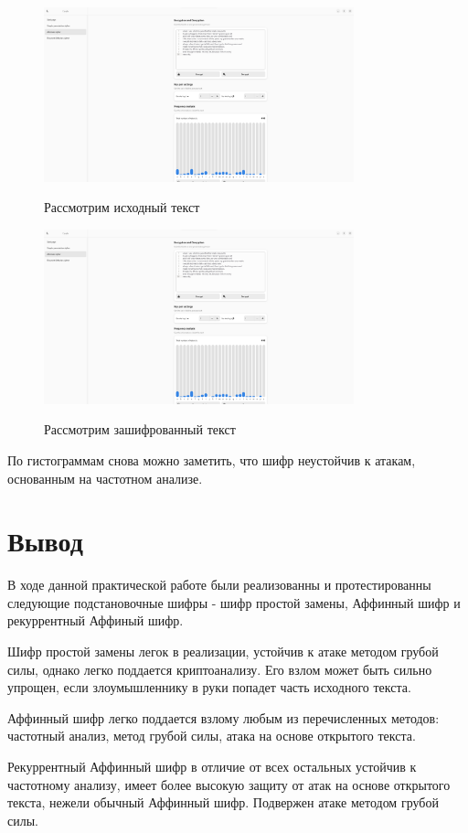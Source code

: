 \documentclass[a4paper]{article}
\begin{document}
  \begin{figure}[H]  
    \centering
    \caption{Рассмотрим исходный текст}
    \includegraphics[width=0.8\textwidth]{01_0016}
    \label{img:0016}
  \end{figure}
  
  \begin{figure}[H]  
    \centering
    \caption{Рассмотрим зашифрованный текст}
    \includegraphics[width=0.8\textwidth]{01_0017}
    \label{img:0017}
  \end{figure}

  По гистограммам снова можно заметить, что шифр неустойчив к атакам, основанным на частотном анализе.
  
  \newpage
  \section{Вывод}

  В ходе данной практической работе были реализованны и протестированны следующие подстановочные 
  шифры - шифр простой замены, Аффинный шифр и рекуррентный Аффиный шифр.

  Шифр простой замены легок в реализации, устойчив к атаке методом грубой силы, однако легко 
  поддается криптоанализу. Его взлом может быть сильно упрощен, если злоумышленнику в руки 
  попадет часть исходного текста.

  Аффинный шифр легко поддается взлому любым из перечисленных методов: частотный анализ, метод грубой 
  силы, атака на основе открытого текста.

  Рекуррентный Аффинный шифр в отличие от всех остальных устойчив к частотному анализу,
  имеет более высокую защиту от атак на основе открытого текста, нежели обычный Аффинный шифр.
  Подвержен атаке методом грубой силы.
\end{document}
